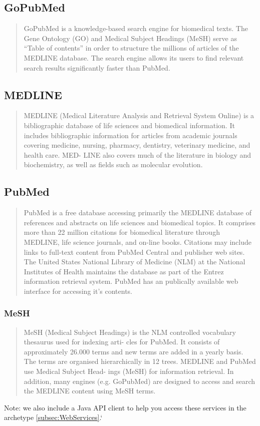 \subsection{GoPubMed}
\begin{quotation}
GoPubMed is a knowledge-based search engine for biomedical texts. The Gene Ontology (GO) and
Medical Subject Headings (MeSH) serve as “Table of contents” in order to structure the millions of
articles of the MEDLINE database. The search engine allows its users to find relevant search results
significantly faster than PubMed.
\end{quotation}
\subsection{MEDLINE}
\begin{quotation}
MEDLINE (Medical Literature Analysis and Retrieval System Online) is a bibliographic database of life
sciences and biomedical information. It includes bibliographic information for articles from academic
journals covering medicine, nursing, pharmacy, dentistry, veterinary medicine, and health care. MED-
LINE also covers much of the literature in biology and biochemistry, as well as fields such as molecular
evolution.
\end{quotation}
\subsection{PubMed}
\begin{quotation}
PubMed is a free database accessing primarily the MEDLINE database of references and abstracts on
life sciences and biomedical topics. It comprises more than 22 million citations for biomedical literature through MEDLINE, life science journals, and on-line books. Citations may include links to full-text
content from PubMed Central and publisher web sites. The United States National Library of Medicine
(NLM) at the National Institutes of Health maintains the database as part of the Entrez information
retrieval system. PubMed has an publically available web interface for accessing it’s contents.
\end{quotation}
\subsubsection{MeSH}
\begin{quotation}
MeSH (Medical Subject Headings) is the NLM controlled vocabulary thesaurus used for indexing arti-
cles for PubMed. It consists of approximately 26.000 terms and new terms are added in a yearly basis.
The terms are organised hierarchically in 12 trees. MEDLINE and PubMed use Medical Subject Head-
ings (MeSH) for information retrieval. In addition, many engines (e.g. GoPubMed) are designed to
access and search the MEDLINE content using MeSH terms.\\
\end{quotation}
Note: we also include a Java API client to help you access these services in the archetype \ref{subsec:WebServices}.`

